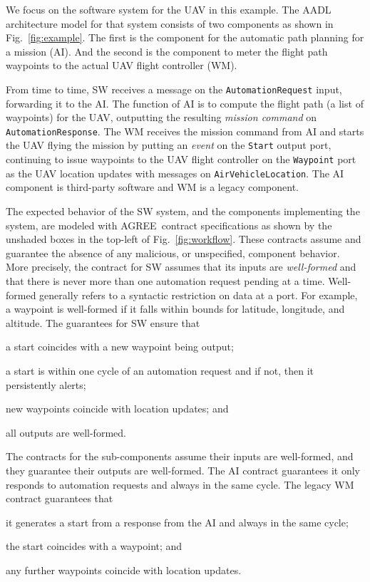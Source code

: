 \documentclass[global,twocolumn]{svjour}
\newcommand{\figref}[1]{Fig.~\ref{#1}}
\newcommand{\agr}{AGREE}
\begin{document}
We focus on the software system for the UAV in this example.
%
The AADL architecture model for that system consists of two components as shown in \figref{fig:example}.
%
The first is the component for the automatic path planning for a mission (AI).
%
And the second is the component to meter the flight path waypoints to the actual UAV flight controller (WM).


From time to time, SW receives a message on the \texttt{AutomationRequest} input, forwarding it to the AI.
%
The function of AI is to compute the flight path (a list of waypoints) for the UAV, outputting the resulting \emph{mission command} on \texttt{AutomationResponse}.
%
The WM receives the mission command from AI and starts the UAV flying the mission by putting an \emph{event} on the \texttt{Start} output port, continuing to issue waypoints to the UAV flight controller on the \texttt{Waypoint} port as the UAV location updates with messages on \texttt{AirVehicleLocation}.
%
The AI component is third-party software and WM is a legacy component.

The expected behavior of the SW system, and the components implementing the system, are modeled with \agr\ contract specifications as shown by the unshaded boxes in the top-left of \figref{fig:workflow}.
%
These contracts assume and guarantee the absence of any malicious, or unspecified, component behavior.
%
More precisely, the contract for SW assumes that its inputs are \emph{well-formed} and that there is never more than one automation request pending at a time.
%
Well-formed generally refers to a syntactic restriction on data at a port. For example, a waypoint is well-formed if it falls within bounds for latitude, longitude, and altitude.
%
The guarantees for SW ensure that
\begin{compactitem}
\item a start coincides with a new waypoint being output;
\item a start is within one cycle of an automation request and if not, then it persistently alerts;
\item new waypoints coincide with location updates; and
\item all outputs are well-formed.
\end{compactitem}

The contracts for the sub-components assume their inputs are well-formed, and they guarantee their outputs are well-formed.
%
The AI contract guarantees it only responds to automation requests and always in the same cycle.
%
The legacy WM contract guarantees that
\begin{compactitem}
  \item it generates a start from a response from the AI and always in the same cycle;
  \item the start coincides with a waypoint; and
  \item any further waypoints coincide with location updates.
\end{compactitem}
\end{document}
